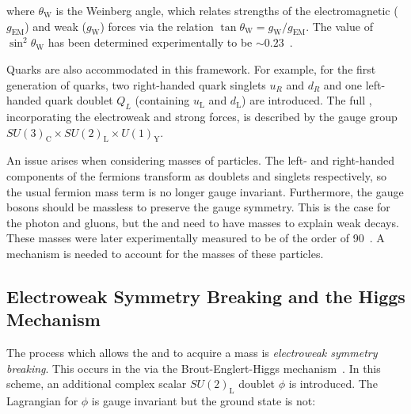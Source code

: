 where $\theta_{\textrm{W}}$ is the Weinberg angle, which relates strengths of the electromagnetic ($g_{\textrm{EM}}$) and weak ($g_{\textrm{W}}$) forces via the relation $\tan \theta_{\textrm{W}} = g_{\textrm{W}} /g_{\textrm{EM}}$. The value of $\sin^2\theta_{\textrm{W}}$ has been determined experimentally to be $\sim 0.23$~\cite{PDGBooklet}.

 Quarks are also accommodated in this framework. For example, for the first generation of quarks, two right-handed quark singlets $u_{R}$ and $d_{R}$ and one left-handed quark doublet $Q_{L}$ (containing $u_{\textrm{L}}$ and $d_{\textrm{L}}$) are introduced. The full \SM, incorporating the electroweak and strong forces, is described by the gauge group $SU(3)_{\textrm{C}} \times SU(2)_{\textrm{L}} \times U(1)_{\textrm{Y}}$.
 
 
An issue arises when considering masses of particles. 
The left- and right-handed components of the fermions transform as doublets and singlets respectively, so the usual fermion mass term is no longer gauge invariant.
Furthermore, the gauge bosons should be massless to preserve the gauge symmetry. This is the case for the photon and gluons, but the \PWpm and \PZ need to have masses to explain weak decays. These masses were later experimentally measured to be of the order of 90\GeV~\cite{PDGBooklet}. A mechanism is needed to account for the masses of these particles. 

\subsection{Electroweak Symmetry Breaking and the Higgs Mechanism}
\label{sec:th:ewsb}

The process which allows the \PWpm and \PZ to acquire a mass is \emph{electroweak symmetry breaking}. This occurs in the \SM via the Brout-Englert-Higgs mechanism~\cite{Englert:1964et,Higgs:1964ia,Higgs:1964pj,Guralnik:1964eu,Higgs:1966ev,Kibble:1967sv}. In this scheme, an additional complex scalar $SU(2)_{\mathrm{L}}$ doublet $\phi$ is introduced. The Lagrangian for $\phi$ is gauge invariant but the ground state is not: 

